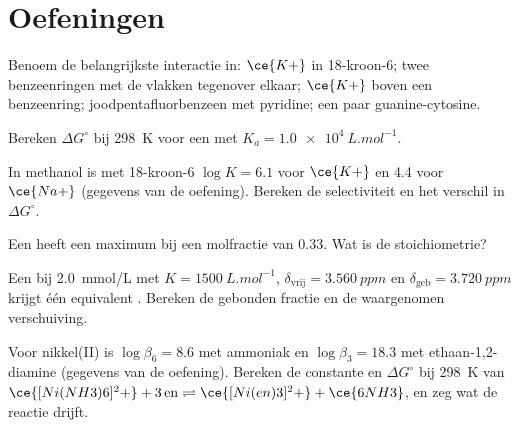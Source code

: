 \section{Oefeningen}

\begin{exercise}[$\star$]\label{exo:b3:supramolecular:1}
Benoem de belangrijkste interactie in: $\ce{K+}$ in 18-kroon-6; twee benzeenringen met de vlakken tegenover elkaar;
$\ce{K+}$ boven een benzeenring; joodpentafluorbenzeen met pyridine; een paar guanine-cytosine.
\end{exercise}

\begin{exercise}[$\star$]\label{exo:b3:supramolecular:2}
Bereken $\Delta G^\circ$ bij \qty{298}{K} voor een  met $K_a = \qty{1.0e4}{L.mol^{-1}}$.
\end{exercise}

\begin{exercise}[$\star$]\label{exo:b3:supramolecular:3}
In methanol is met 18-kroon-6 $\log K = 6.1$ voor $\ce{K+}$ en 4.4 voor $\ce{Na+}$ (gegevens van de oefening).
Bereken de selectiviteit en het verschil in $\Delta G^\circ$.
\end{exercise}

\begin{exercise}[$\star$]\label{exo:b3:supramolecular:4}
Een  heeft een maximum bij een molfractie  van
0.33. Wat is de stoichiometrie?
\end{exercise}

\begin{exercise}[$\star\star$]\label{exo:b3:supramolecular:5}
Een  bij \qty{2.0}{mmol/L} met $K = \qty{1500}{L.mol^{-1}}$, $\delta_{\mathrm{vrij}} = \qty{3.560}{ppm}$ en $\delta_{\mathrm{geb}} = \qty{3.720}{ppm}$ krijgt één
equivalent . Bereken de gebonden fractie en de waargenomen
verschuiving.
\end{exercise}

\begin{exercise}[$\star\star$]\label{exo:b3:supramolecular:6}
Voor nikkel(II) is $\log\beta_6 = 8.6$ met ammoniak en $\log\beta_3 = 18.3$ met ethaan-1,2-diamine (gegevens van de
oefening). Bereken de constante en $\Delta G^\circ$ bij \qty{298}{K} van
$\ce{[Ni(NH3)6]^2+} + 3\,\mathrm{en} \rightleftharpoons \ce{[Ni(en)3]^2+} + \ce{6NH3}$, en zeg wat de reactie drijft.
\end{exercise}

